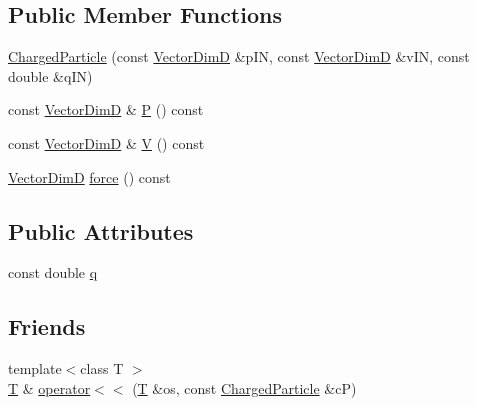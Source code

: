 \subsection*{Public Member Functions}
\begin{DoxyCompactItemize}
\item 
\hyperlink{classmodel_1_1_charged_particle_a15f9d1f6eaff7808e665e3bb4d959d1f}{Charged\+Particle} (const \hyperlink{classmodel_1_1_charged_particle_a31a77e0315958d087309087da65b422d}{Vector\+Dim\+D} \&p\+I\+N, const \hyperlink{classmodel_1_1_charged_particle_a31a77e0315958d087309087da65b422d}{Vector\+Dim\+D} \&v\+I\+N, const double \&q\+I\+N)
\item 
const \hyperlink{classmodel_1_1_charged_particle_a31a77e0315958d087309087da65b422d}{Vector\+Dim\+D} \& \hyperlink{classmodel_1_1_charged_particle_ac4fb5067e8eade7d858fc9fc2c489cac}{P} () const 
\item 
const \hyperlink{classmodel_1_1_charged_particle_a31a77e0315958d087309087da65b422d}{Vector\+Dim\+D} \& \hyperlink{classmodel_1_1_charged_particle_a19024b973779c10d45a9525aa142816f}{V} () const 
\item 
\hyperlink{classmodel_1_1_charged_particle_a31a77e0315958d087309087da65b422d}{Vector\+Dim\+D} \hyperlink{classmodel_1_1_charged_particle_a96b537a1c0a0a9d36622f0050063bf5a}{force} () const 
\end{DoxyCompactItemize}
\subsection*{Public Attributes}
\begin{DoxyCompactItemize}
\item 
const double \hyperlink{classmodel_1_1_charged_particle_a28db4e3ad1c803a36dca08d36bbaae21}{q}
\end{DoxyCompactItemize}
\subsection*{Friends}
\begin{DoxyCompactItemize}
\item 
{\footnotesize template$<$class T $>$ }\\\hyperlink{_spline_node_base__corder1_8h_a82692d3a5502b91460591f1d5504314a}{T} \& \hyperlink{classmodel_1_1_charged_particle_ae7ca94567c666191a97e56ce5ec6b7bf}{operator$<$$<$} (\hyperlink{_spline_node_base__corder1_8h_a82692d3a5502b91460591f1d5504314a}{T} \&os, const \hyperlink{classmodel_1_1_charged_particle}{Charged\+Particle} \&c\+P)
\end{DoxyCompactItemize}


